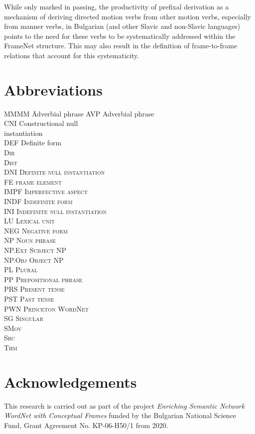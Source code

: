 \documentclass[output=paper,colorlinks,citecolor=brown]{langscibook}
\begin{document}
While only marked in passing, the productivity of prefixal derivation as a mechanism of deriving directed motion verbs from other motion verbs, especially from manner verbs, in Bulgarian (and other Slavic and non-Slavic languages) points to the need for these verbs to be systematically addressed within the FrameNet structure. This may also result in the definition of frame-to-frame relations that account for this systematicity. 

\section*{Abbreviations}
\begin{multicols}{2}
\begin{tabbing}
MMMM \= Adverbial phrase\kill
AVP \> Adverbial phrase\\
CNI \> Constructional null \\ \> instantiation\\
DEF \> Definite form\\
\scshape Dir \> \\
\scshape Dist \> \\
DNI \> Definite null instantiation\\
FE \> frame element\\
IMPF \> Imperfective aspect\\
INDF \> Indefinite form\\
INI \> Indefinite null instantiation\\
LU \> Lexical unit\\
NEG \> Negative form\\
NP \> Noun phrase\\
NP.Ext \> Subject NP\\
NP.Obj \> Object NP\\
PL \> Plural\\
PP \> Prepositional phrase\\
PRS \> Present tense\\
PST \> Past tense\\
PWN \> Princeton WordNet\\
SG \> Singular\\
\scshape SMov \> \\
\scshape Src \> \\
\scshape Thm \> 
\end{tabbing}
\end{multicols}

\section*{Acknowledgements}

This research is carried out as part of the project \emph{Enriching Semantic Network WordNet with Conceptual Frames} funded by the Bulgarian National Science Fund, Grant Agreement No. KP-06-H50/1 from 2020.

{\sloppy\printbibliography[heading=subbibliography,notkeyword=this]}
\end{document}
